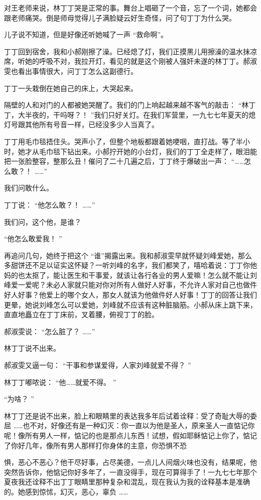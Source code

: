 \documentclass[12pt,twoside,openany]{book}
\begin{document}
对王老师来说，林丁丁哭是正常的事。舞台上唱砸了一个音，忘了一个词，她都会跟老师痛哭。倒是师母觉得儿子满脸疑云好生奇怪，问了句丁丁为什么哭。

儿子说不知道，但是好像还听她喊了一声 “救命啊”。

丁丁回到宿舍，我和小郝刚擦了澡。已经熄了灯，我们正摸黑儿用擦澡的温水抹凉席，听她的呼吸不对，我拉开灯，看见的就是这个刚被人强奸未遂的林丁丁。郝淑雯也看出事情很大，问丁丁怎么这副德行。

丁丁一头栽倒在她自己的床上，大哭起来。

隔壁的人和对门的人都被她哭醒了。我们的门上响起越来越不客气的敲击： “林丁丁，大半夜的，干吗呀？！ ”我们只好关灯。在我们军营里，一九七七年夏天的熄灯号跟其他所有号音一样，已经没多少人当真了。

丁丁用毛巾毯捂住头。哭声小了，但整个地板都跟着她哽咽，直打战。等了半小时，她才从毛巾毯下钻出来。小郝拧开她的小台灯，我们的丁丁全走样了，眼泪能把一张脸整容，整那么丑！催问了二十几遍之后，丁丁终于爆破出一声： “……怎么敢？！ ……”

我们问敢什么。

丁丁说： “他怎么敢？！ ……”

我们问，这个他，是谁？

“他怎么敢爱我！ ”

再追问几句，她终于把这个 “谁”揭露出来。我和郝淑雯早就怀疑刘峰爱她，那么多甜饼还不足以证实这怀疑？一听刘峰的名字，我们都笑了，嘻哈着说：丁丁你他妈的也太抠了，能让医生和干事爱，就该让各行各业的男人爱嘛！怎么就不能让刘峰爱一爱呢？未必人家就只能对你对所有人做好人好事，不允许人家对自己也做件好人好事？他爱上的哪个女人，那女人就该为他做件好人好事！丁丁的回答让我们更晕，她说刘峰怎么可以爱她，刘峰就不应该有这种脏脑筋。小郝从床上跳下来，直直地矗立在丁丁床前，叉着腰，俯视丁丁的脸。

郝淑雯说： “怎么脏了？ ……”

林丁丁说不出来。

郝淑雯又逼一句： “干事和参谋爱得，人家刘峰就爱不得？ ”

林丁丁嘟哝说： “他……就爱不得。 ”

“为啥？ ”

林丁丁还是说不出来，脸上和眼睛里的表达我多年后试着诠释：受了奇耻大辱的委屈 ……也不对，好像还有是一种幻灭：你一直以为他是圣人，原来圣人一直惦记你呢！像所有男人一样，惦记的也是那点儿东西！试想，假如耶稣惦记上你了，惦记了你好几年，像所有男人那样打你身体的主意，你恐惧不恐

惧，恶心不恶心？他干尽好事，占尽美德，一点儿人间烟火味也没有，结果呢，他突然告诉你，他惦记你好多年了，一直没得手，现在可算得手了！一九七七年那个夏夜我还诠释不出丁丁眼睛里那种复杂和混乱，现在我认为我的诠释基本是准确的。她感到惊怵，幻灭，恶心，辜负 ……
\end{document}
